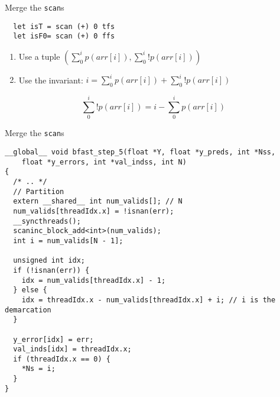 \begin{frame}[fragile]{Merge the \texttt{scan}s}
\begin{verbatim}
  let isT = scan (+) 0 tfs
  let isF0= scan (+) 0 ffs
\end{verbatim}

  \begin{enumerate}
      \item Use a tuple \( (\sum_0^i p(arr[i]), \sum_0^i !p(arr[i]) ) \)
      \item Use the invariant: \( i = \sum_0^i p(arr[i]) + \sum_0^i !p(arr[i]) \)
  \end{enumerate}
  \pause

  \[  \sum_0^i !p(arr[i]) = i - \sum_0^i p(arr[i]) \]

\end{frame}


\begin{frame}[fragile]{Merge the \texttt{scan}s}
\begin{verbatim}
__global__ void bfast_step_5(float *Y, float *y_preds, int *Nss,
    float *y_errors, int *val_indss, int N)
{
  /* .. */
  // Partition
  extern __shared__ int num_valids[]; // N
  num_valids[threadIdx.x] = !isnan(err);
  __syncthreads();
  scaninc_block_add<int>(num_valids);
  int i = num_valids[N - 1];

  unsigned int idx;
  if (!isnan(err)) {
    idx = num_valids[threadIdx.x] - 1;
  } else {
    idx = threadIdx.x - num_valids[threadIdx.x] + i; // i is the demarcation
  }

  y_error[idx] = err;
  val_inds[idx] = threadIdx.x;
  if (threadIdx.x == 0) {
    *Ns = i;
  }
}
\end{verbatim}
\end{frame}

